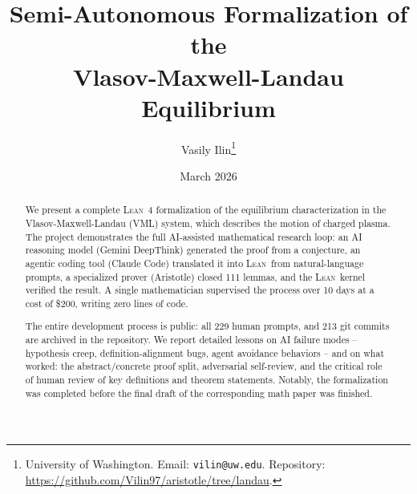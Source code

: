 \documentclass[11pt]{article}
\title{Semi-Autonomous Formalization of the\\Vlasov-Maxwell-Landau Equilibrium}
\author{Vasily Ilin\thanks{University of Washington. Email: \texttt{vilin@uw.edu}. Repository: \url{https://github.com/Vilin97/aristotle/tree/landau}.}}
\date{March 2026}
\newcommand{\lean}{\textsc{Lean}}
\begin{document}
\maketitle

\begin{abstract}
We present a complete \lean~4 formalization of the equilibrium characterization in the Vlasov-Maxwell-Landau (VML) system, which describes the motion of charged plasma. The project demonstrates the full AI-assisted mathematical research loop: an AI reasoning model (Gemini DeepThink) generated the proof from a conjecture, an agentic coding tool (Claude Code) translated it into \lean\ from natural-language prompts, a specialized prover (Aristotle) closed 111 lemmas, and the \lean\ kernel verified the result. A single mathematician supervised the process over 10 days at a cost of \$200, writing zero lines of code.

The entire development process is public: all 229 human prompts, and 213 git commits are archived in the repository. We report detailed lessons on AI failure modes -- hypothesis creep, definition-alignment bugs, agent avoidance behaviors -- and on what worked: the abstract/concrete proof split, adversarial self-review, and the critical role of human review of key definitions and theorem statements. Notably, the formalization was completed before the final draft of the corresponding math paper was finished.
\end{abstract}
\end{document}
